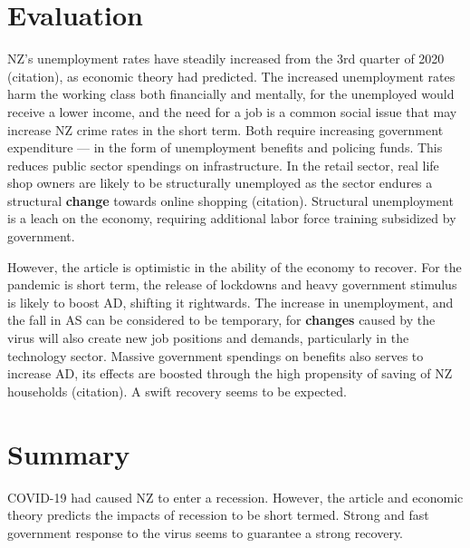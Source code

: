 \documentclass[a4paper,12pt]{article}
\begin{document}
\section*{Evaluation}

NZ's unemployment rates have steadily increased from the 3rd quarter of 2020 (citation), as economic theory had predicted. The increased unemployment rates harm the working class both financially and mentally, for the unemployed would receive a lower income, and the need for a job is a common social issue that may increase NZ crime rates in the short term. Both require increasing government expenditure --- in the form of unemployment benefits and policing funds. This reduces public sector spendings on infrastructure. In the retail sector, real life shop owners are likely to be structurally unemployed as the sector endures a structural \textbf{change} towards online shopping (citation). Structural unemployment is a leach on the economy, requiring additional labor force training subsidized by government.

However, the article is optimistic in the ability of the economy to recover. For the pandemic is short term, the release of lockdowns and heavy government stimulus is likely to boost AD, shifting it rightwards. The increase in unemployment, and the fall in AS can be considered to be temporary, for \textbf{changes} caused by the virus will also create new job positions and demands, particularly in the technology sector. Massive government spendings on benefits also serves to increase AD, its effects are boosted through the high propensity of saving of NZ households (citation). A swift recovery seems to be expected.


\section*{Summary}

COVID-19 had caused NZ to enter a recession. However, the article and economic theory predicts the impacts of recession to be short termed. Strong and fast government response to the virus seems to guarantee a strong recovery.

\newpage
\nocite{*}
\printbibliography
\end{document}
